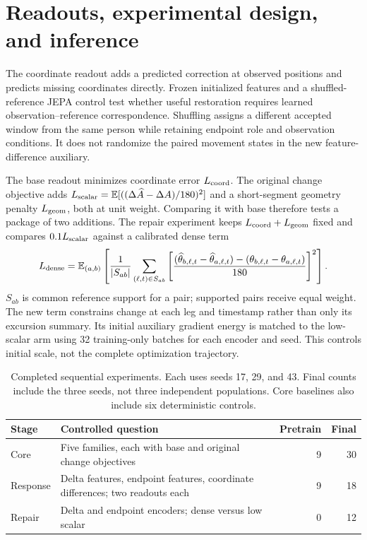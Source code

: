 \documentclass{article}
\begin{document}
\clearpage
\section{Readouts, experimental design, and inference}
The coordinate readout adds a predicted correction at observed positions and predicts missing coordinates directly. Frozen initialized features and a shuffled-reference JEPA control test whether useful restoration requires learned observation--reference correspondence. Shuffling assigns a different accepted window from the same person while retaining endpoint role and observation conditions. It does not randomize the paired movement states in the new feature-difference auxiliary.

The base readout minimizes coordinate error $L_{\rm coord}$. The original change objective adds $L_{\rm scalar}=\mathbb E[((\Delta\widehat A-\Delta A)/180)^2]$ and a short-segment geometry penalty $L_{\rm geom}$, both at unit weight. Comparing it with base therefore tests a package of two additions. The repair experiment keeps $L_{\rm coord}+L_{\rm geom}$ fixed and compares $0.1L_{\rm scalar}$ against a calibrated dense term
\begin{equation}
L_{\rm dense}=\mathbb E_{(a,b)}\left[\frac{1}{|S_{ab}|}\sum_{(\ell,t)\in S_{ab}}
\left[\frac{(\widehat\theta_{b,\ell,t}-\widehat\theta_{a,\ell,t})-(\theta_{b,\ell,t}-\theta_{a,\ell,t})}{180}\right]^2\right].
\end{equation}
$S_{ab}$ is common reference support for a pair; supported pairs receive equal weight. The new term constrains change at each leg and timestamp rather than only its excursion summary. Its initial auxiliary gradient energy is matched to the low-scalar arm using 32 training-only batches for each encoder and seed. This controls initial scale, not the complete optimization trajectory.

\begin{table}[h]\centering\small
\caption{Completed sequential experiments. Each uses seeds 17, 29, and 43. Final counts include the three seeds, not three independent populations. Core baselines also include six deterministic controls.}
\label{tab:matrix}
\begin{tabular}{p{.85in}p{3.0in}rr}\toprule
Stage & Controlled question & Pretrain & Final\\\midrule
Core & Five families, each with base and original change objectives &9&30\\
Response & Delta features, endpoint features, coordinate differences; two readouts each &9&18\\
Repair & Delta and endpoint encoders; dense versus low scalar &0&12\\\bottomrule
\end{tabular}\end{table}
\end{document}
